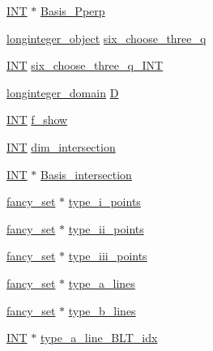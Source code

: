 \begin{DoxyCompactItemize}
\item 
\mbox{\hyperlink{galois_8h_a09fddde158a3a20bd2dcadb609de11dc}{I\+NT}} $\ast$ \mbox{\hyperlink{classknarr_ae023f4d9f0962b407517efad7ce091ae}{Basis\+\_\+\+Pperp}}
\item 
\mbox{\hyperlink{classlonginteger__object}{longinteger\+\_\+object}} \mbox{\hyperlink{classknarr_ae5199b879f3944e43a85ae4b5f02ddc6}{six\+\_\+choose\+\_\+three\+\_\+q}}
\item 
\mbox{\hyperlink{galois_8h_a09fddde158a3a20bd2dcadb609de11dc}{I\+NT}} \mbox{\hyperlink{classknarr_aaf9d3f44793438dbe092a8fafdcf3ba7}{six\+\_\+choose\+\_\+three\+\_\+q\+\_\+\+I\+NT}}
\item 
\mbox{\hyperlink{classlonginteger__domain}{longinteger\+\_\+domain}} \mbox{\hyperlink{classknarr_a18b88990fe2bbfc25c8a9da4bf4dec1a}{D}}
\item 
\mbox{\hyperlink{galois_8h_a09fddde158a3a20bd2dcadb609de11dc}{I\+NT}} \mbox{\hyperlink{classknarr_ac33e2d33577532c229bd9e9e4335c610}{f\+\_\+show}}
\item 
\mbox{\hyperlink{galois_8h_a09fddde158a3a20bd2dcadb609de11dc}{I\+NT}} \mbox{\hyperlink{classknarr_a08f22338b0990cce0a424e63c37ecbf3}{dim\+\_\+intersection}}
\item 
\mbox{\hyperlink{galois_8h_a09fddde158a3a20bd2dcadb609de11dc}{I\+NT}} $\ast$ \mbox{\hyperlink{classknarr_ac05a70f8271d2c30b25f8467a9537853}{Basis\+\_\+intersection}}
\item 
\mbox{\hyperlink{classfancy__set}{fancy\+\_\+set}} $\ast$ \mbox{\hyperlink{classknarr_a84f2b07c48c7e66ffe06447a8a18c719}{type\+\_\+i\+\_\+points}}
\item 
\mbox{\hyperlink{classfancy__set}{fancy\+\_\+set}} $\ast$ \mbox{\hyperlink{classknarr_a5f58def9af3d4cc1f5f3ba7b67b20599}{type\+\_\+ii\+\_\+points}}
\item 
\mbox{\hyperlink{classfancy__set}{fancy\+\_\+set}} $\ast$ \mbox{\hyperlink{classknarr_a666674559f2c3134fd8bef909d796024}{type\+\_\+iii\+\_\+points}}
\item 
\mbox{\hyperlink{classfancy__set}{fancy\+\_\+set}} $\ast$ \mbox{\hyperlink{classknarr_af0977b618ab97e5ad03a8cf58bd86425}{type\+\_\+a\+\_\+lines}}
\item 
\mbox{\hyperlink{classfancy__set}{fancy\+\_\+set}} $\ast$ \mbox{\hyperlink{classknarr_acba69cf902a9a7f0886faf16a335e75a}{type\+\_\+b\+\_\+lines}}
\item 
\mbox{\hyperlink{galois_8h_a09fddde158a3a20bd2dcadb609de11dc}{I\+NT}} $\ast$ \mbox{\hyperlink{classknarr_a60add9dcb7a7b13c45dc34b315470b4f}{type\+\_\+a\+\_\+line\+\_\+\+B\+L\+T\+\_\+idx}}

\end{DoxyCompactItemize}
